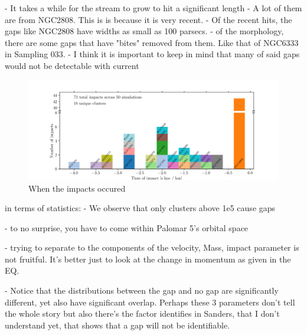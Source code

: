 \documentclass[draft]{aa}
\begin{document}
      - It takes a while for the stream to grow to hit a significant length
      - A lot of them are from NGC2808. This is is because it is very recent. 
      - Of the recent hits, the gaps like NGC2808 have widths as small as 100 parsecs.
      - of the morphology, there are some gaps that have "bites" removed from them. Like that of NGC6333 in Sampling 033. 
      - I think it is important to keep in mind that many of said gaps would not be detectable with current 

  \begin{figure}
    \centering
    \includegraphics[width=\linewidth]{histogram_impact_time.png}
    \caption{When the impacts occured}
    \label{fig:histogram_impact_time}
    \end{figure}    


    in terms of statistics: 
    - We observe that only clusters above 1e5 cause gaps
    
    - to no surprise, you have to come within Palomar 5's orbital space 
    
    - trying to separate to the components of the velocity, Mass, impact parameter is not fruitful. It's better just to look at the change in momentum as given in the EQ.
    
    - Notice that the distributions between the gap and no gap are significantly different, yet also have significant overlap. Perhaps these 3 parameters don't tell the whole story but also there's the factor identifies in Sanders, that I don't understand yet, that shows that a gap will not be identifiable. 
  
\end{document}
